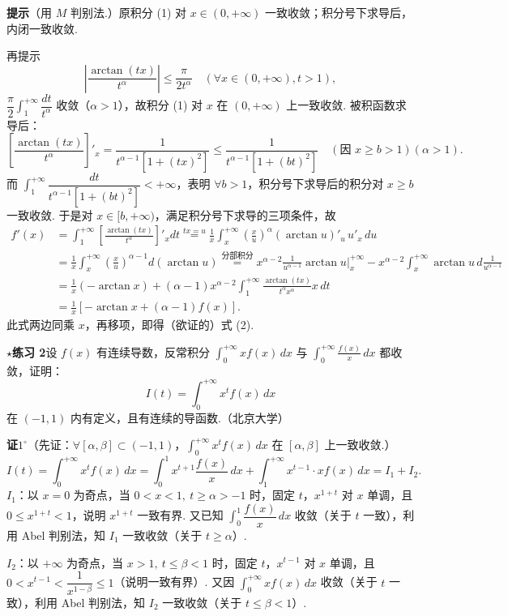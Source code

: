 \documentclass[UTF8, 12pt, fontset=fandol, oneside]{ctexart}
\begin{document}
\noindent\textbf{提示}\quad （用 $M$ 判别法.）原积分 (1) 对 $x\in(0,+\infty)$ 一致收敛；积分号下求导后，内闭一致收敛.

再提示
\[
\left|\frac{\arctan(tx)}{t^\alpha}\right|\le\frac{\pi}{2t^\alpha}\quad(\forall x\in(0,+\infty),t>1),
\]
$\dfrac{\pi}{2}\displaystyle\int_1^{+\infty}\dfrac{dt}{t^\alpha}$ 收敛（$\alpha>1$），故积分 (1) 对 $x$ 在 $(0,+\infty)$ 上一致收敛. 被积函数求导后：
\[
\left[\frac{\arctan(tx)}{t^\alpha}\right]'_x
=\frac1{t^{\alpha-1}[1+(tx)^2]}
\le\frac1{t^{\alpha-1}[1+(bt)^2]}\quad(\text{因 }x\ge b>1)(\alpha>1).
\]
而 $\displaystyle\int_1^{+\infty}\dfrac{dt}{t^{\alpha-1}[1+(bt)^2]}<+\infty$，表明 $\forall b>1$，积分号下求导后的积分对 $x\ge b$ 一致收敛. 于是对 $x\in[b,+\infty)$，满足积分号下求导的三项条件，故
\[
\begin{aligned}
f'(x)
&=\int_1^{+\infty}\left[\frac{\arctan(tx)}{t^\alpha}\right]'_xdt
\overset{tx=u}{=}\frac1x\int_x^{+\infty}\left(\frac xu\right)^\alpha(\arctan u)'_u\,u'_x\,du\\
&=\frac1x\int_x^{+\infty}\left(\frac xu\right)^{\alpha-1}d(\arctan u)
\overset{\text{分部积分}}{=}x^{\alpha-2}\frac1{u^{\alpha-1}}\arctan u\bigg|_x^{+\infty}
-x^{\alpha-2}\int_x^{+\infty}\arctan u\,d\frac1{u^{\alpha-1}}\\
&=\frac1x(-\arctan x)+(\alpha-1)x^{\alpha-2}\int_1^{+\infty}\frac{\arctan(tx)}{t^\alpha x^\alpha}x\,dt\\
&=\frac1x[-\arctan x+(\alpha-1)f(x)].
\end{aligned}
\]
此式两边同乘 $x$，再移项，即得（欲证的）式 (2).

\noindent\textbf{$\star$练习 2}\quad 设 $f(x)$ 有连续导数，反常积分 $\displaystyle\int_0^{+\infty}xf(x)\,dx$ 与 $\displaystyle\int_0^{+\infty}\frac{f(x)}x\,dx$ 都收敛，证明：
\[
I(t)=\int_0^{+\infty}x^tf(x)\,dx
\]
在 $(-1,1)$ 内有定义，且有连续的导函数.（北京大学）

\noindent\textbf{证}\quad $1^\circ$（先证：$\forall[\alpha,\beta]\subset(-1,1)$，$\displaystyle\int_0^{+\infty}x^tf(x)\,dx$ 在 $[\alpha,\beta]$ 上一致收敛.）
\[
I(t)=\int_0^{+\infty}x^tf(x)\,dx
=\int_0^1x^{t+1}\frac{f(x)}x\,dx+\int_1^{+\infty}x^{t-1}\cdot xf(x)\,dx=I_1+I_2.
\]
$I_1$：以 $x=0$ 为奇点，当 $0<x<1,\ t\ge\alpha>-1$ 时，固定 $t$，$x^{1+t}$ 对 $x$ 单调，且 $0\le x^{1+t}<1$，说明 $x^{1+t}$ 一致有界. 又已知 $\displaystyle\int_0^1\dfrac{f(x)}x\,dx$ 收敛（关于 $t$ 一致），利用 Abel 判别法，知 $I_1$ 一致收敛（关于 $t\ge\alpha$）.

$I_2$：以 $+\infty$ 为奇点，当 $x>1,\ t\le\beta<1$ 时，固定 $t$，$x^{t-1}$ 对 $x$ 单调，且 $0<x^{t-1}<\dfrac1{x^{1-\beta}}\le1$（说明一致有界）. 又因 $\displaystyle\int_0^{+\infty}xf(x)\,dx$ 收敛（关于 $t$ 一致），利用 Abel 判别法，知 $I_2$ 一致收敛（关于 $t\le\beta<1$）.
\end{document}
